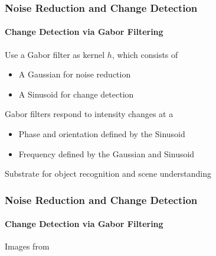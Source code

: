 \documentclass[xetex,professionalfont]{beamer}
\begin{document}
\begin{frame}
\frametitle{Noise Reduction and Change Detection}
\framesubtitle{Change Detection via Gabor Filtering}

Use a Gabor filter as kernel $h$, which consists of
\begin{itemize}
	\item A Gaussian for noise reduction
	\item A Sinusoid for change detection 
\end{itemize}

\bigskip
Gabor filters respond to intensity changes at a
\begin{itemize}
	\item Phase and orientation defined by the Sinusoid %
	\item Frequency defined by the Gaussian and Sinusoid
\end{itemize}

\bigskip
Substrate for object recognition and scene understanding

\end{frame}


\begin{frame}
\frametitle{Noise Reduction and Change Detection}
\framesubtitle{Change Detection via Gabor Filtering}

\begin{center}
	{\centering Images from \cite{prince12}}
\end{center}

\end{frame}

\end{document}
